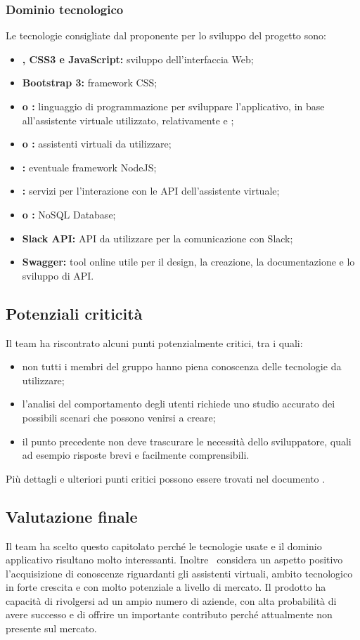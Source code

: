 \documentclass[../StudioDiFattibilita.tex]{subfiles}
\begin{document}
	 	\subsubsection{Dominio tecnologico}
		Le tecnologie consigliate dal proponente per lo sviluppo del progetto sono:
		\begin{itemize}
			\item \textbf{, CSS3 e JavaScript:} sviluppo dell'interfaccia Web;
			\item \textbf{Bootstrap 3:} framework CSS;
			\item \textbf{ o :} linguaggio di programmazione per sviluppare l'applicativo, in base all'assistente virtuale utilizzato, relativamente  e ;
			\item \textbf{ o :} assistenti virtuali da utilizzare;
			\item \textbf{:} eventuale framework NodeJS;
			\item \textbf{:} servizi per l'interazione con le API dell'assistente virtuale;
			\item \textbf{ o :} NoSQL Database;
			\item \textbf{Slack API:} API da utilizzare per la comunicazione con Slack;
			\item \textbf{Swagger:} tool online utile per il design, la creazione, la documentazione e lo sviluppo di API.
		\end{itemize}

		\subsection{Potenziali criticità}
		Il team ha riscontrato alcuni punti potenzialmente critici, tra i quali:
		\begin{itemize}
			\item non tutti i membri del gruppo hanno piena conoscenza delle tecnologie da utilizzare;
			\item l'analisi del comportamento degli utenti richiede uno studio accurato dei possibili scenari che possono venirsi a creare;
			\item il punto precedente non deve trascurare le necessità dello sviluppatore, quali ad esempio risposte brevi e facilmente comprensibili.
		\end{itemize}
		Più dettagli e ulteriori punti critici possono essere trovati nel documento \pianodiprogettov.

	\subsection{Valutazione finale}
	Il team ha scelto questo capitolato perché le tecnologie usate e il dominio applicativo risultano molto interessanti. Inoltre \kpanic\ considera un aspetto positivo l'acquisizione di conoscenze riguardanti gli assistenti virtuali, ambito tecnologico in forte crescita e con molto potenziale a livello di mercato. Il prodotto ha capacità di rivolgersi ad un ampio numero di aziende, con alta probabilità di avere successo e di offrire un importante contributo perché attualmente non presente sul mercato.
\end{document}
